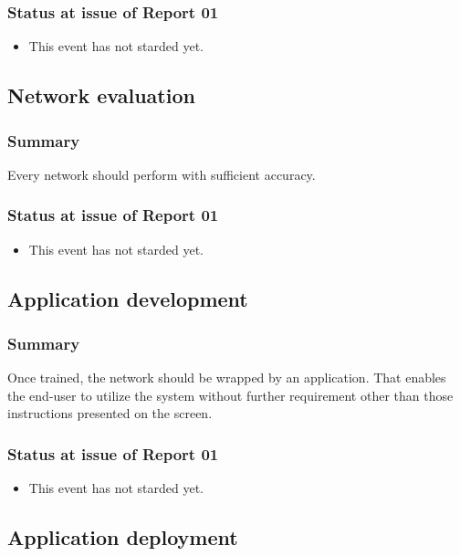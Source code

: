 \documentclass{article}
\begin{document}
\begin{enumerate}
\subsubsection{Status at issue of Report 01}
\label{sec:org08cae8a}
\begin{itemize}
\item This event has not starded yet.
\end{itemize}

\subsection{Network evaluation}
\label{sec:org760e603}
\subsubsection{Summary}
\label{sec:orgd97aca4}
Every network should perform with sufficient accuracy.
\subsubsection{Status at issue of Report 01}
\label{sec:org4550d29}
\begin{itemize}
\item This event has not starded yet.
\end{itemize}

\subsection{Application development}
\label{sec:org35b4e6d}
\subsubsection{Summary}
\label{sec:org5509097}
Once trained, the network should be wrapped by an application.
That enables the end-user to utilize the system without further requirement other than those instructions presented on the screen.
\subsubsection{Status at issue of Report 01}
\label{sec:orgebe1d81}
\begin{itemize}
\item This event has not starded yet.
\end{itemize}

\subsection{Application deployment}
\label{sec:org81b590b}

\end{enumerate}
\end{document}
